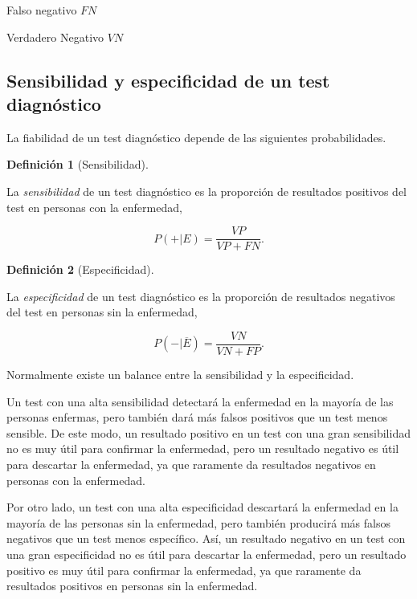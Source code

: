 \documentclass[
  a4paper,
]{scrreport}
\theoremstyle{plain}
\theoremstyle{definition}
\newtheorem{definition}{Definición}[chapter]
\theoremstyle{definition}
\theoremstyle{remark}
\begin{document}
{Falso negativo }\(FN\)

{Verdadero Negativo }\(VN\)

\subsection{Sensibilidad y especificidad de un test
diagnóstico}\label{sensibilidad-y-especificidad-de-un-test-diagnuxf3stico}

La fiabilidad de un test diagnóstico depende de las siguientes
probabilidades.

\begin{definition}[Sensibilidad]\protect\hypertarget{def-sensibilidad}{}\label{def-sensibilidad}

La \emph{sensibilidad} de un test diagnóstico es la proporción de
resultados positivos del test en personas con la enfermedad,

\[P(+|E)=\frac{VP}{VP+FN}.\]

\end{definition}

\begin{definition}[Especificidad]\protect\hypertarget{def-especificidad}{}\label{def-especificidad}

La \emph{especificidad} de un test diagnóstico es la proporción de
resultados negativos del test en personas sin la enfermedad,

\[P(-|\overline{E})=\frac{VN}{VN+FP}.\]

\end{definition}

Normalmente existe un balance entre la sensibilidad y la especificidad.

Un test con una alta sensibilidad detectará la enfermedad en la mayoría
de las personas enfermas, pero también dará más falsos positivos que un
test menos sensible. De este modo, un resultado positivo en un test con
una gran sensibilidad no es muy útil para confirmar la enfermedad, pero
un resultado negativo es útil para descartar la enfermedad, ya que
raramente da resultados negativos en personas con la enfermedad.

Por otro lado, un test con una alta especificidad descartará la
enfermedad en la mayoría de las personas sin la enfermedad, pero también
producirá más falsos negativos que un test menos específico. Así, un
resultado negativo en un test con una gran especificidad no es útil para
descartar la enfermedad, pero un resultado positivo es muy útil para
confirmar la enfermedad, ya que raramente da resultados positivos en
personas sin la enfermedad.
\end{document}
